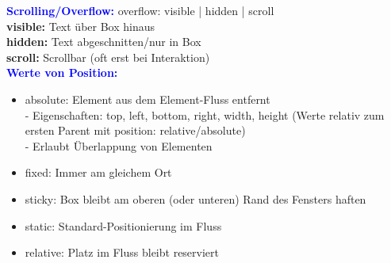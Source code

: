 \textbf{\textcolor{blue}{Scrolling/Overflow:}} overflow: visible | hidden | scroll\\
\textbf{visible:} Text über Box hinaus\\
\textbf{hidden:} Text abgeschnitten/nur in Box\\
\textbf{scroll:} Scrollbar (oft erst bei Interaktion)\\
\textbf{\textcolor{blue}{Werte von Position:}}
\begin{itemize}[topsep=0pt, leftmargin=3mm]
    \setlength\itemsep{-0.3em}
    \item absolute: Element aus dem Element-Fluss entfernt\\
    - Eigenschaften: top, left, bottom, right, width, height (Werte relativ zum ersten Parent mit position: relative/absolute)\\
    - Erlaubt Überlappung von Elementen
    \item fixed: Immer am gleichem Ort
    \item sticky: Box bleibt am oberen (oder unteren) Rand des Fensters haften
    \item static: Standard-Positionierung im Fluss
    \item relative: Platz im Fluss bleibt reserviert
\end{itemize}
